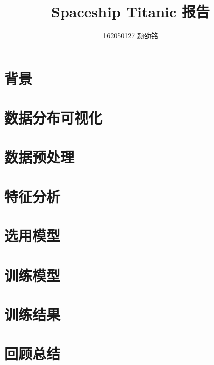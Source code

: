 \documentclass[fontset=windows]{article}
\title{Spaceship Titanic 报告}
\author{162050127 颜劭铭}
\date{\zhtoday}
\begin{document}
\maketitle
\tableofcontents

\clearpage

\section{背景}

    

\section{数据分布可视化}

    

\section{数据预处理}

    

\section{特征分析}

    

\section{选用模型}

    

\section{训练模型}

    

\section{训练结果}

    

\section{回顾总结}

    
\end{document}

